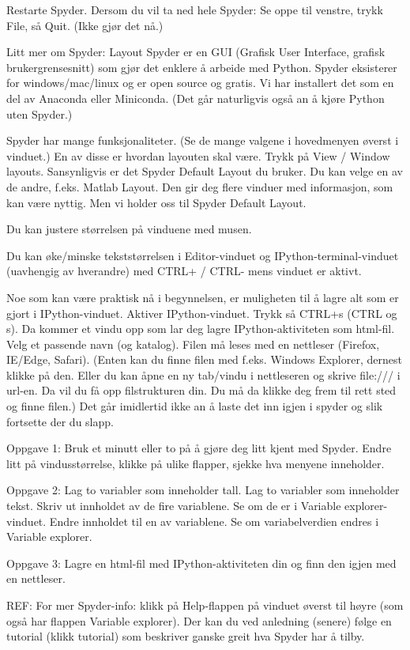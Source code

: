 Restarte Spyder.
Dersom du vil ta ned hele Spyder: Se oppe til venstre, trykk File, så Quit. 
(Ikke gjør det nå.) 


Litt mer om Spyder: Layout 
Spyder er en GUI (Grafisk User Interface, grafisk brukergrensesnitt)
som gjør det enklere å arbeide med Python.
Spyder eksisterer for windows/mac/linux og er open source og gratis. 
Vi har installert det som en del av Anaconda eller Miniconda. 
(Det går naturligvis også an å kjøre Python uten Spyder.)


Spyder har mange funksjonaliteter.
(Se de mange valgene i hovedmenyen øverst i vinduet.)
En av disse er hvordan layouten skal være. 
Trykk på View / Window layouts.
Sansynligvis er det Spyder Default Layout du bruker.
Du kan velge en av de andre, f.eks. Matlab Layout.
Den gir deg flere vinduer med informasjon, som kan være nyttig.
Men vi holder oss til Spyder Default Layout.

Du kan justere størrelsen på vinduene med musen. 

Du kan øke/minske tekststørrelsen i Editor-vinduet og IPython-terminal-vinduet
(uavhengig av hverandre) med CTRL+ / CTRL- mens vinduet er aktivt. 

Noe som kan være praktisk nå i begynnelsen, er muligheten til å lagre alt
som er gjort i IPython-vinduet. 
Aktiver IPython-vinduet. Trykk så CTRL+s (CTRL og s).
Da kommer et vindu opp som lar deg lagre IPython-aktiviteten som html-fil.
Velg et passende navn (og katalog).
Filen må leses med en nettleser (Firefox, IE/Edge, Safari).
(Enten kan du finne filen med f.eks. Windows Explorer, dernest klikke på den. 
Eller du kan åpne en ny tab/vindu i nettleseren og skrive file:/// i url-en.
Da vil du få opp filstrukturen din. Du må da klikke deg frem til rett sted og finne filen.)
Det går imidlertid ikke an å laste det inn igjen i spyder og slik fortsette der du slapp. 


Oppgave 1:
Bruk et minutt eller to på å gjøre deg litt kjent med Spyder.
Endre litt på vindusstørrelse, klikke på ulike flapper, sjekke hva menyene inneholder. 

Oppgave 2:
Lag to variabler som inneholder tall. Lag to variabler som inneholder tekst.
Skriv ut innholdet av de fire variablene. Se om de er i Variable explorer-vinduet.
Endre innholdet til en av variablene. Se om variabelverdien endres i Variable explorer.

Oppgave 3:
Lagre en html-fil med IPython-aktiviteten din og finn den igjen med en nettleser. 


REF: For mer Spyder-info: klikk på Help-flappen på vinduet øverst til høyre
(som også har flappen Variable explorer).
Der kan du ved anledning (senere) følge en tutorial (klikk tutorial)
som beskriver ganske greit hva Spyder har å tilby.


\fi
